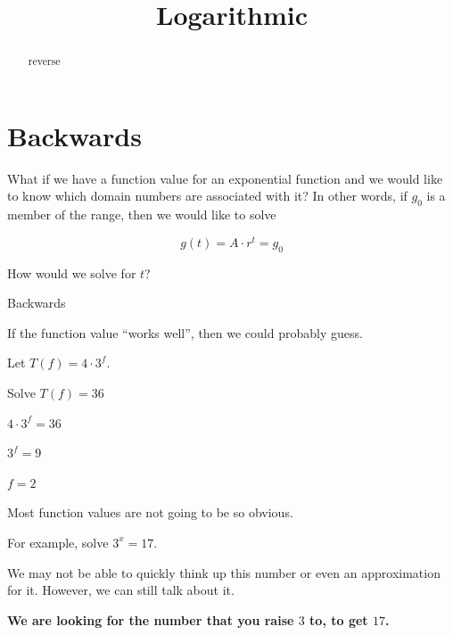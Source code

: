 \documentclass{ximera}
\title{Logarithmic}
\begin{document}
\begin{abstract}
reverse
\end{abstract}
\maketitle







\section*{Backwards}

What if we have a function value for an exponential function and we would like to know which domain numbers are associated with it?  In other words, if $g_0$ is a member of the range, then we would like to solve


\[    g(t) = A \cdot r^t  =   g_0    \]


How would we solve for $t$?






\begin{example} Backwards


If the function value ``works well'', then we could probably guess.

Let $T(f) = 4 \cdot 3^f$.  


Solve $T(f) = 36$

$4 \cdot 3^f = 36$

$3^f = 9$

$f = 2$

\end{example}









Most function values are not going to be so obvious. 


For example, solve $ 3^x = 17$.


We may not be able to quickly think up this number or even an approximation for it.  However, we can still talk about it.

\begin{center}

\textbf{\textcolor{purple!85!blue}{We are looking for the number that you raise $3$ to, to get $17$.}}

\end{center}
\end{document}
